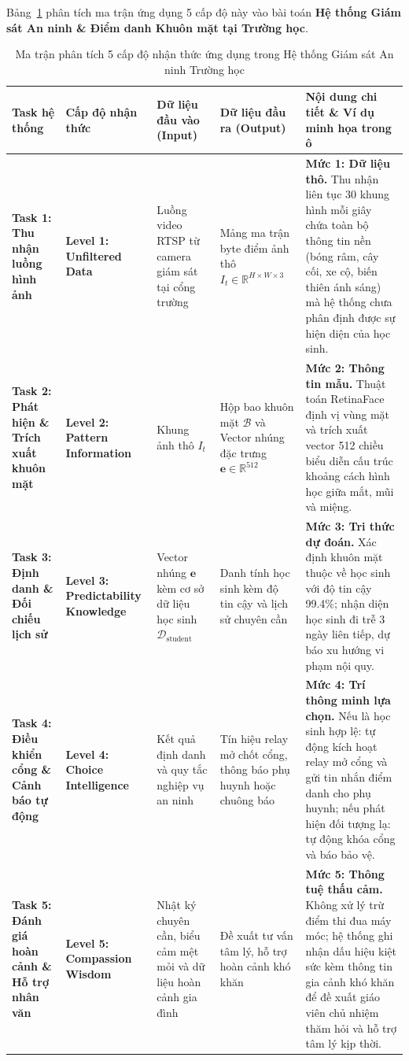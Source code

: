 Bảng~\ref{tab:matrix_5_levels_school} phân tích ma trận ứng dụng 5 cấp độ này vào bài toán \textbf{Hệ thống Giám sát An ninh \& Điểm danh Khuôn mặt tại Trường học}.

\begin{table}[H]
\centering
\scriptsize
\setlength{\tabcolsep}{3.5pt}
\caption{Ma trận phân tích 5 cấp độ nhận thức ứng dụng trong Hệ thống Giám sát An ninh Trường học}
\label{tab:matrix_5_levels_school}
\renewcommand{\arraystretch}{1.3}
\begin{tabularx}{\textwidth}{|p{2.1cm}|p{2.0cm}|p{2.5cm}|p{2.4cm}|X|}
\hline
\textbf{Task hệ thống} & \textbf{Cấp độ nhận thức} & \textbf{Dữ liệu đầu vào (Input)} & \textbf{Dữ liệu đầu ra (Output)} & \textbf{Nội dung chi tiết \& Ví dụ minh họa trong ô} \\
\hline
\textbf{Task 1: Thu nhận luồng hình ảnh} & \textbf{Level 1: Unfiltered Data} & Luồng video RTSP từ camera giám sát tại cổng trường & Mảng ma trận byte điểm ảnh thô $I_t \in \mathbb{R}^{H \times W \times 3}$ & \textbf{Mức 1: Dữ liệu thô.} Thu nhận liên tục 30 khung hình mỗi giây chứa toàn bộ thông tin nền (bóng râm, cây cối, xe cộ, biến thiên ánh sáng) mà hệ thống chưa phân định được sự hiện diện của học sinh. \\
\hline
\textbf{Task 2: Phát hiện \& Trích xuất khuôn mặt} & \textbf{Level 2: Pattern Information} & Khung ảnh thô $I_t$ & Hộp bao khuôn mặt $\mathcal{B}$ và Vector nhúng đặc trưng $\mathbf{e} \in \mathbb{R}^{512}$ & \textbf{Mức 2: Thông tin mẫu.} Thuật toán RetinaFace định vị vùng mặt và trích xuất vector 512 chiều biểu diễn cấu trúc khoảng cách hình học giữa mắt, mũi và miệng. \\
\hline
\textbf{Task 3: Định danh \& Đối chiếu lịch sử} & \textbf{Level 3: Predictability Knowledge} & Vector nhúng $\mathbf{e}$ kèm cơ sở dữ liệu học sinh $\mathcal{D}_{\text{student}}$ & Danh tính học sinh kèm độ tin cậy và lịch sử chuyên cần & \textbf{Mức 3: Tri thức dự đoán.} Xác định khuôn mặt thuộc về học sinh với độ tin cậy 99.4\%; nhận diện học sinh đi trễ 3 ngày liên tiếp, dự báo xu hướng vi phạm nội quy. \\
\hline
\textbf{Task 4: Điều khiển cổng \& Cảnh báo tự động} & \textbf{Level 4: Choice Intelligence} & Kết quả định danh và quy tắc nghiệp vụ an ninh & Tín hiệu relay mở chốt cổng, thông báo phụ huynh hoặc chuông báo & \textbf{Mức 4: Trí thông minh lựa chọn.} Nếu là học sinh hợp lệ: tự động kích hoạt relay mở cổng và gửi tin nhắn điểm danh cho phụ huynh; nếu phát hiện đối tượng lạ: tự động khóa cổng và báo bảo vệ. \\
\hline
\textbf{Task 5: Đánh giá hoàn cảnh \& Hỗ trợ nhân văn} & \textbf{Level 5: Compassion Wisdom} & Nhật ký chuyên cần, biểu cảm mệt mỏi và dữ liệu hoàn cảnh gia đình & Đề xuất tư vấn tâm lý, hỗ trợ hoàn cảnh khó khăn & \textbf{Mức 5: Thông tuệ thấu cảm.} Không xử lý trừ điểm thi đua máy móc; hệ thống ghi nhận dấu hiệu kiệt sức kèm thông tin gia cảnh khó khăn để đề xuất giáo viên chủ nhiệm thăm hỏi và hỗ trợ tâm lý kịp thời. \\
\hline
\end{tabularx}
\end{table}


